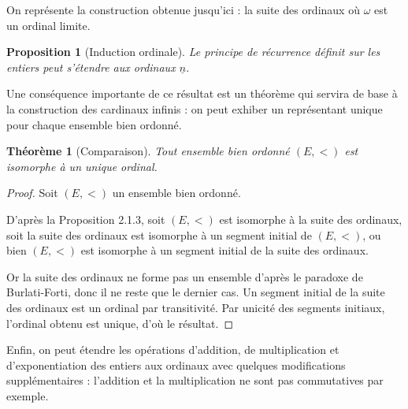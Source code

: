 \documentclass{article}
\theoremstyle{definition}
\theoremstyle{plain}
\newtheorem{proposition}[subsubsection]{Proposition}
\newtheorem{theorem}[subsubsection]{Théorème}
\theoremstyle{plain}
\theoremstyle{plain}
\theoremstyle{plain}
\theoremstyle{plain}
\begin{document}
\par On représente la construction obtenue jusqu'ici : la suite des ordinaux où \( \omega \) est un ordinal limite.
\begin{center}
\end{center}

\begin{proposition}[Induction ordinale]
	Le principe de récurrence définit sur les entiers peut s'étendre aux ordinaux \( \underline{n} \).
\end{proposition}

\par Une conséquence importante de ce résultat est un théorème qui servira de base à la construction des cardinaux infinis : on peut exhiber un représentant unique pour chaque ensemble bien ordonné.

\begin{theorem}[Comparaison]
	Tout ensemble bien ordonné \( (E,<) \) est isomorphe à un unique ordinal.
\end{theorem}
\begin{proof}
	Soit \( (E,<) \) un ensemble bien ordonné. 
	
	D'après la Proposition 2.1.3, soit \( (E,<) \) est isomorphe à la suite des ordinaux, soit la suite des ordinaux est isomorphe à un segment initial de \( (E,<) \), ou bien \( (E,<) \) est isomorphe à un segment initial de la suite des ordinaux.

	Or la suite des ordinaux ne forme pas un ensemble d'après le paradoxe de Burlati-Forti, donc il ne reste que le dernier cas. Un segment initial de la suite des ordinaux est un ordinal par transitivité. Par unicité des segments initiaux, l'ordinal obtenu est unique, d'où le résultat. 
\end{proof}

\par Enfin, on peut étendre les opérations d'addition, de multiplication et d'exponentiation des entiers aux ordinaux avec quelques modifications supplémentaires : l'addition et la multiplication ne sont pas commutatives par exemple.
\end{document}
